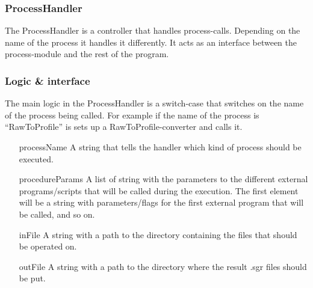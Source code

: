 \subsubsection{ProcessHandler}
The ProcessHandler is a controller that handles process-calls. Depending on the name of the process it handles it differently. It acts as an interface between the process-module and the rest of the program. 


\subsubsection{Logic \& interface}
The main logic in the ProcessHandler is a switch-case that switches on the name of the process being called. For example if the name of the process is “RawToProfile” is sets up a RawToProfile-converter and calls it. 

\begin{itemize}
\item[processName] A string that tells the handler which kind of process should be executed.
\item[procedureParams] A list of string with the parameters to the different external  programs/scripts that will be called during the execution. The first element will be a string with parameters/flags for the first external program that will be called, and so on.
\item[inFile] A string with a path to the directory containing the files that should be operated on.
\item[outFile] A string with a path to the directory where the result .sgr files should be put.

\end{itemize}




